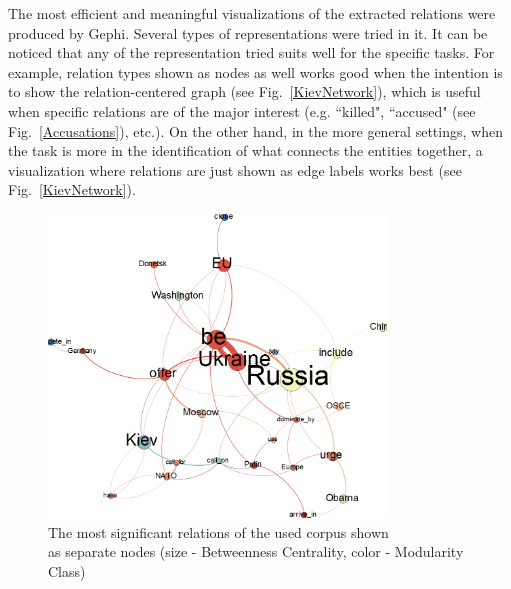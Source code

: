 \documentclass[]{article}
\begin{document}
The most efficient and meaningful visualizations of the extracted relations were produced by Gephi. Several types of representations were tried in it. It can be noticed that any of the representation tried suits well for the specific tasks. For example, relation types shown as nodes as well works good when the intention is to show the relation-centered graph (see Fig.~\ref{KievNetwork}), which is useful when specific relations are of the major interest (e.g. ``killed", ``accused" (see Fig.~\ref{Accusations}), etc.). On the other hand, in the more general settings, when the task is more in the identification of what connects the entities together, a visualization where relations are just shown as edge labels works best (see Fig.~\ref{KievNetwork}).
\begin{figure}[htbp]
  \centering
    \includegraphics[width=0.8\textwidth]{images/AllRelations}
    \captionsetup{justification=centering}
    \caption{The most significant relations of the used corpus shown \\ as separate nodes (size - Betweenness Centrality, color - Modularity Class)}
  \label{AllRelations}
\end{figure}
\end{document}
